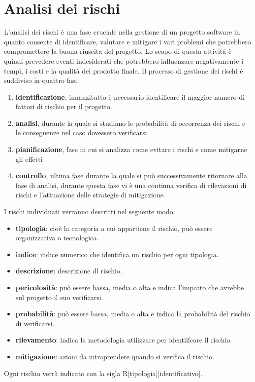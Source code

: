 \documentclass[a4paper, 12pt]{article}
\begin{document}
\section{Analisi dei rischi}
\label{sec:adr}
L'analisi dei rischi è una fase cruciale nella gestione di un progetto software in quanto consente di identificare, valutare e mitigare
i vari problemi che potrebbero compromettere la buona riuscita del progetto. Lo scopo di questa attività è quindi prevedere eventi indesiderati
che potrebbero influenzare negativamente i tempi, i costi e la qualità del prodotto finale.
Il processo di gestione dei rischi è suddiviso in quattro fasi:
\begin{enumerate}
    \item \textbf{identificazione}, innanzitutto è necessario identificare il maggior numero di fattori di rischio per il progetto.
    \item \textbf{analisi}, durante la quale si studiano le probabilità di occorrenza dei rischi e le conseguenze nel caso dovessero verificarsi.
    \item \textbf{pianificazione}, fase in cui si analizza come evitare i rischi e come mitigarne gli effetti 
    \item \textbf{controllo}, ultima fase durante la quale si può successivamente ritornare alla fase di analisi, durante questa fase vi è una continua verifica di rilevazioni di rischi e 
    l'attuazione delle strategie di mitigazione. 
\end{enumerate}
I rischi individuati verranno descritti nel seguente modo:
\begin{itemize}
    \item \textbf{tipologia}: cioè la categoria a cui appartiene il rischio, può essere organizzativa o tecnologica.
    \item \textbf{indice}: indice numerico che identifica un rischio per ogni tipologia.
    \item \textbf{descrizione}: descrizione dl rischio.
    \item \textbf{pericolosità}: può essere bassa, media o alta e indica l'impatto che avrebbe sul progetto il suo verificarsi.
    \item \textbf{probabilità}: può essere bassa, media o alta e indica la probabilità del rischio di verificarsi.
    \item \textbf{rilevamento}: indica la metodologia utilizzare per identiifcare il rischio.
    \item \textbf{mitigazione}: azioni da intraprendere quando si verifica il rischio.   
\end{itemize}
Ogni rischio verrà indicato con la sigla R[tipologia][identificativo].
\end{document}
